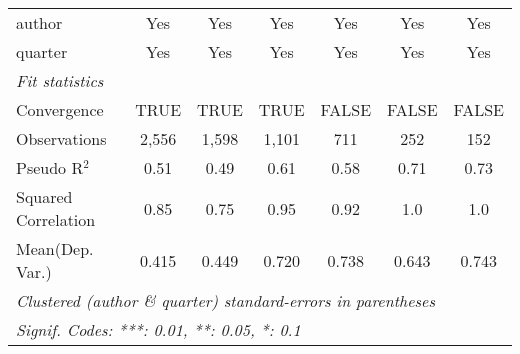 \begin{tabular}{lcccccc}
   author                                                     & Yes           & Yes            & Yes          & Yes           & Yes           & Yes\\  
   quarter                                                    & Yes           & Yes            & Yes          & Yes           & Yes           & Yes\\  
   \midrule
   \emph{Fit statistics}\\
   Convergence                                                &TRUE           & TRUE           & TRUE         & FALSE         & FALSE         & FALSE\\  
   Observations                                               & 2,556         & 1,598          & 1,101        & 711           & 252           & 152\\  
   Pseudo R$^2$                                               & 0.51          & 0.49           & 0.61         & 0.58          & 0.71          & 0.73\\  
   Squared Correlation                                        & 0.85          & 0.75           & 0.95         & 0.92          & 1.0           & 1.0\\  
Mean(Dep. Var.) & 0.415 & 0.449 & 0.720 & 0.738 & 0.643 & 0.743 \\
   \midrule \midrule
   \multicolumn{7}{l}{\emph{Clustered (author \& quarter) standard-errors in parentheses}}\\
   \multicolumn{7}{l}{\emph{Signif. Codes: ***: 0.01, **: 0.05, *: 0.1}}\\
\end{tabular}
\par\endgroup
